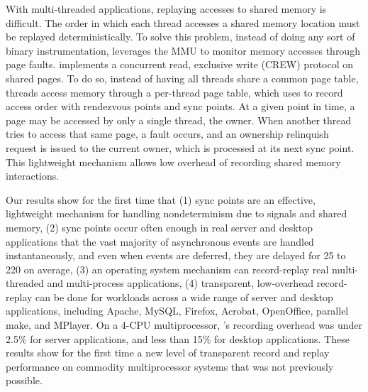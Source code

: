 With multi-threaded applications, replaying accesses to shared memory is
difficult. The order in which each thread accesses a shared memory location must
be replayed deterministically. To solve this problem, instead of doing any sort
of binary instrumentation, \scribe leverages the MMU to monitor memory accesses
through page faults. \scribe implements a concurrent read, exclusive write
(CREW) protocol on shared pages. To do so, instead of having all threads share a
common page table, threads access memory through a per-thread page table, which
\scribe uses to record access order with rendezvous points and sync points.
At a given point in time, a page may be accessed by only a single thread, the
owner. When another thread tries to access that same page, a fault occurs,
and an ownership relinquish request is issued to the current owner, which is
processed at its next sync point. This lightweight mechanism allows low
overhead of recording shared memory interactions.

Our results show for the first time that (1) sync points are an effective,
lightweight mechanism for handling nondeterminism due to signals and shared
memory, (2) sync points occur often enough in real server and desktop
applications that the vast majority of asynchronous events are handled
instantaneously, and even when events are deferred, they are delayed for 25 to
220\us{} on average, (3) an operating system mechanism can record-replay real
multi-threaded and multi-process applications, (4) transparent, low-overhead
record-replay can be done for workloads across a wide range of server and
desktop applications, including Apache, MySQL, Firefox, Acrobat, OpenOffice,
parallel make, and MPlayer.  On a 4-CPU multiprocessor, \scribe{}'s recording
overhead was under 2.5\% for server applications, and less than 15\% for desktop
applications.  These results show for the first time a new level of transparent
record and replay performance on commodity multiprocessor systems that was not
previously possible. 

